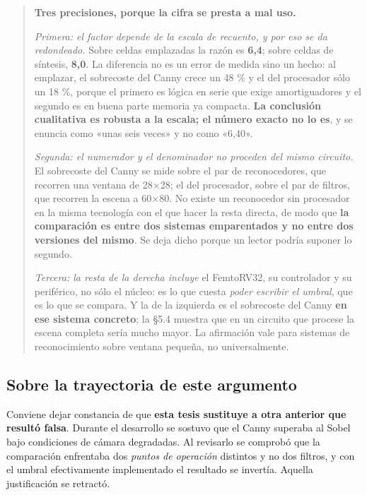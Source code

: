 \begin{quote}
\textbf{Tres precisiones, porque la cifra se presta a mal uso.}

\emph{Primera: el factor depende de la escala de recuento, y por eso se
da redondeado.} Sobre celdas emplazadas la razón es \textbf{6,4}; sobre
celdas de síntesis, \textbf{8,0}. La diferencia no es un error de medida
sino un hecho: al emplazar, el sobrecoste del Canny crece un 48 \% y el
del procesador sólo un 18 \%, porque el primero es lógica en serie que
exige amortiguadores y el segundo es en buena parte memoria ya compacta.
\textbf{La conclusión cualitativa es robusta a la escala; el número
exacto no lo es}, y se enuncia como «unas seis veces» y no como «6,40».

\emph{Segunda: el numerador y el denominador no proceden del mismo
circuito.} El sobrecoste del Canny se mide sobre el par de
reconocedores, que recorren una ventana de 28×28; el del procesador,
sobre el par de filtros, que recorren la escena a 60×80. No existe un
reconocedor sin procesador en la misma tecnología con el que hacer la
resta directa, de modo que \textbf{la comparación es entre dos sistemas
emparentados y no entre dos versiones del mismo}. Se deja dicho porque
un lector podría suponer lo segundo.

\emph{Tercera: la resta de la derecha incluye} el FemtoRV32, su
controlador y su periférico, no sólo el núcleo: es lo que cuesta
\emph{poder escribir el umbral}, que es lo que se compara. Y la de la
izquierda es el sobrecoste del Canny \textbf{en ese sistema concreto};
la §5.4 muestra que en un circuito que procese la escena completa sería
mucho mayor. La afirmación vale para sistemas de reconocimiento sobre
ventana pequeña, no universalmente.
\end{quote}

\subsection{Sobre la trayectoria de este
argumento}\label{sobre-la-trayectoria-de-este-argumento}

Conviene dejar constancia de que \textbf{esta tesis sustituye a otra
anterior que resultó falsa}. Durante el desarrollo se sostuvo que el
Canny superaba al Sobel bajo condiciones de cámara degradadas. Al
revisarlo se comprobó que la comparación enfrentaba dos \emph{puntos de
operación} distintos y no dos filtros, y con el umbral efectivamente
implementado el resultado se invertía. Aquella justificación se
retractó.

